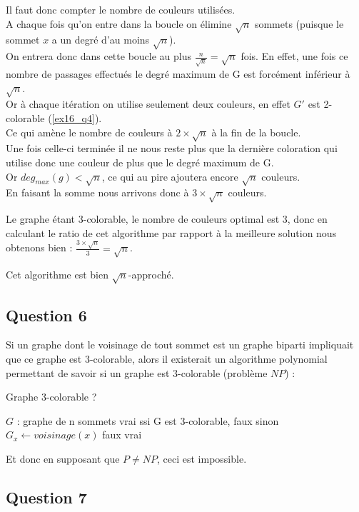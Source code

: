 Il faut donc compter le nombre de couleurs utilis\'ees.\\
A chaque fois qu'on entre dans la boucle on \'elimine $\sqrt{n}$ sommets (puisque le
sommet $x$ a un degr\'e d'au moins $\sqrt{n}$).\\
On entrera donc dans cette boucle au plus $\frac{n}{\sqrt{n}} = \sqrt{n}$ fois.
En effet, une fois ce nombre de passages effectu\'es le degr\'e maximum de G est
forc\'ement inf\'erieur \`a $\sqrt{n}$.\\
Or \`a chaque it\'eration on utilise seulement deux couleurs, en effet $G'$ est
2-colorable (\ref{ex16_q4}).\\
Ce qui am\`ene le nombre de couleurs \`a $2 \times \sqrt{n}$ \`a la fin de la boucle.\\
Une fois celle-ci termin\'ee il ne nous reste plus que la derni\`ere coloration qui
utilise donc une couleur de plus que le degr\'e maximum de G.\\
Or $deg_{max}(g) < \sqrt{n}$, ce qui au pire ajoutera encore $\sqrt{n}$ couleurs.\\
En faisant la somme nous arrivons donc \`a $3 \times \sqrt{n}$ couleurs.

Le graphe \'etant 3-colorable, le nombre de couleurs optimal est 3, donc en calculant le
ratio de cet algorithme par rapport \`a la meilleure solution nous obtenons bien :
$\frac{3 \times \sqrt{n}}{3} = \sqrt{n}$.

Cet algorithme est bien $\sqrt{n}$-approch\'e.

\subsection{Question 6}\label{ex16_q6}
Si un graphe dont le voisinage de tout sommet est un graphe biparti impliquait que ce
graphe est 3-colorable, alors il existerait un algorithme polynomial permettant de
savoir si un graphe est 3-colorable (probl\`eme $NP$) :

\begin{center}
\begin{algorithm}[H]
\caption{Graphe 3-colorable ?}\label{ex16_algo2}
\begin{algorithmic}[1]
\REQUIRE $G$ : graphe de n sommets
\ENSURE vrai ssi G est 3-colorable, faux sinon  
		\STATE $G_x \leftarrow voisinage(x)$
			\RETURN faux
		\ENDIF
	\ENDFOR
	\RETURN vrai
\end{algorithmic}
\end{algorithm}
\end{center}

Et donc en supposant que $P \neq NP$, ceci est impossible.

\subsection{Question 7}\label{ex16_q7}

